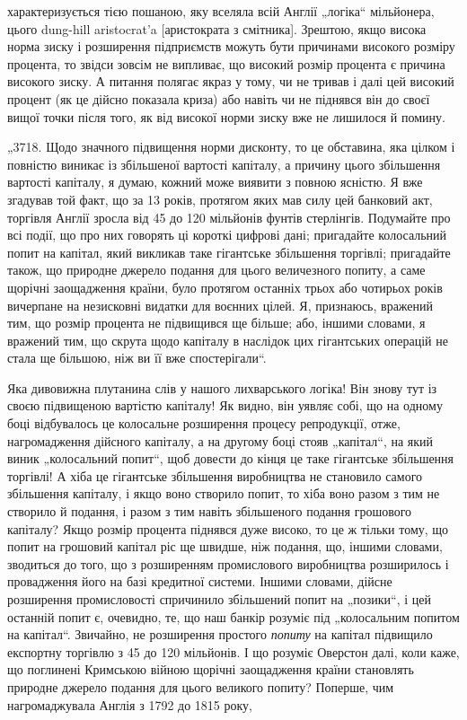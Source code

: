 \parcont{}  %
характеризується тією пошаною, яку вселяла всій Англії „логіка“
мільйонера, цього dung-hill aristocrat’a [аристократа з смітника].
Зрештою, якщо висока норма зиску і розширення підприємств
можуть бути причинами високого розміру процента, то звідси
зовсім не випливає, що високий розмір процента є причина високого зиску. А питання полягає якраз у
тому, чи не тривав і далі
цей високий процент (як це дійсно показала криза) або навіть чи не піднявся він до своєї вищої точки
після того, як від
високої норми зиску вже не лишилося й помину.

„3718. Щодо значного підвищення норми дисконту, то це
обставина, яка цілком і повністю виникає із збільшеної вартості капіталу, а причину цього збільшення
вартості капіталу, я думаю, кожний може виявити з повною ясністю. Я вже згадував
той факт, що за 13 років, протягом яких мав силу цей банковий акт, торгівля Англії зросла від 45 до
120 мільйонів фунтів
стерлінгів. Подумайте про всі події, що про них говорять ці короткі цифрові дані; пригадайте
колосальний попит на капітал,
який викликав таке гігантське збільшення торгівлі; пригадайте
також, що природне джерело подання для цього величезного попиту, а саме щорічні заощадження країни,
було протягом останніх трьох або чотирьох років вичерпане на незисковні видатки
для воєнних цілей. Я, признаюсь, вражений тим, що розмір процента не підвищився ще більше; або,
іншими словами, я вражений тим, що скрута щодо капіталу в наслідок цих гігантських
операцій не стала ще більшою, ніж ви її вже спостерігали“.

Яка дивовижна плутанина слів у нашого лихварського логіка!
Він знову тут із своєю підвищеною вартістю капіталу! Як видно,
він уявляє собі, що на одному боці відбувалось це колосальне
розширення процесу репродукції, отже, нагромадження дійсного
капіталу, а на другому боці стояв „капітал“, на який виник
„колосальний попит“, щоб довести до кінця це таке гігантське
збільшення торгівлі! А хіба це гігантське збільшення виробництва
не становило самого збільшення капіталу, і якщо воно створило
попит, то хіба воно разом з тим не створило й подання, і разом
з тим навіть збільшеного подання грошового капіталу? Якщо
розмір процента піднявся дуже високо, то це ж тільки тому,
що попит на грошовий капітал ріс ще швидше, ніж подання,
що, іншими словами, зводиться до того, що з розширенням промислового виробництва розширилось і
провадження його на
базі кредитної системи. Іншими словами, дійсне розширення
промисловості спричинило збільшений попит на „позики“, і цей
останній попит є, очевидно, те, що наш банкір розуміє під „колосальним попитом на капітал“.
Звичайно, не розширення простого \emph{попиту} на капітал підвищило експортну торгівлю з 45 до
120 мільйонів. І що розуміє Оверстон далі, коли каже, що
поглинені Кримською війною щорічні заощадження країни становлять природне джерело подання для цього
великого попиту? Поперше, чим нагромаджувала Англія з 1792 до 1815 року,
\parbreak{}  %
